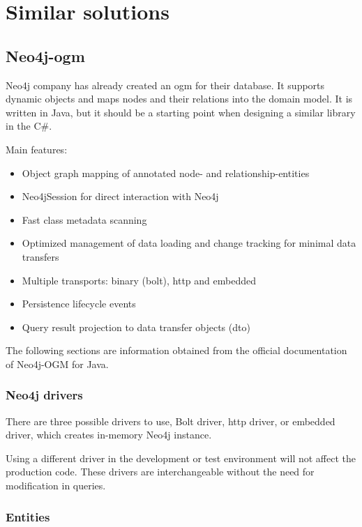 \chapter {Similar solutions}

\section{Neo4j-\acrshort{ogm}}

Neo4j company has already created an \acrshort{ogm} for their database. It supports dynamic objects and maps nodes and their relations into the domain model.
It is written in Java, but it should be a starting point when designing a similar library in the C\#.

\noindent Main features:
\begin{itemize}
    \item Object graph mapping of annotated node- and relationship-entities
    \item Neo4jSession for direct interaction with Neo4j
    \item Fast class metadata scanning
    \item Optimized management of data loading and change tracking for minimal data transfers
    \item Multiple transports: binary (bolt), \acrshort{http} and embedded
    \item Persistence lifecycle events
    \item Query result projection to data transfer objects (\acrshort{dto})
\end{itemize}

The following sections are information obtained from the official documentation of Neo4j-OGM for Java. \cite{noauthor_reference_nodate}

\subsection {Neo4j drivers}

There are three possible drivers to use, Bolt driver, \acrshort{http} driver, or embedded driver, which creates in-memory Neo4j instance.

Using a different driver in the development or test environment will not affect the production code. These drivers are interchangeable without the need for modification in queries.

\subsection {Entities}

